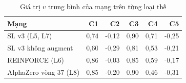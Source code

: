 \begin{table}[H]
  \centering
  \small
  \caption{Giá trị $v$ trung bình của mạng trên từng loại thế}
  \label{tab:cs-mang-ct-value}
  \begin{tabular}{lrrrrr}
    \toprule
    Mạng & C1 & C2 & C3 & C4 & C5 \\
    \midrule
    SL v3 (L5, L7) & 0,74 & -0,12 & 0,90 & 0,71 & -0,25 \\
    SL v3 không augment & 0,60 & -0,29 & 0,81 & 0,53 & -0,21 \\
    REINFORCE (L6) & 0,86 & -0,03 & 0,85 & 0,59 & -0,17 \\
    AlphaZero vòng 37 (L8) & 0,85 & -0,20 & 0,90 & 0,46 & -0,31 \\
    \bottomrule
  \end{tabular}
\end{table}
